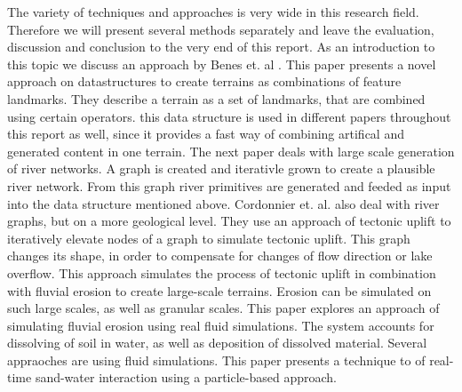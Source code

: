 The variety of techniques and approaches is very wide in this research field. Therefore we will present several methods separately and leave the evaluation, discussion and conclusion to the very end of this report. As an introduction to this topic we discuss an approach by Benes et. al \cite{CGF:CGF12530}. This paper presents a novel approach on datastructures to create terrains as combinations of feature landmarks. They describe a terrain as a set of landmarks, that are combined using certain operators. this data structure is used in different papers throughout this report as well, since it provides a fast way of combining artifical and generated content in one terrain. The next paper  \cite{Genevaux:2013:TGU:2461912.2461996} deals with large scale generation of river networks. A graph is created and iterativle grown to create a plausible river network. From this graph river primitives are generated and feeded as input into the data structure mentioned above. Cordonnier et. al. \cite{cordonnier2016large} also deal with river graphs, but on a more geological level. They use an approach of tectonic uplift to iteratively elevate nodes of a graph to simulate tectonic uplift. This graph changes its shape, in order to compensate for changes of flow direction or lake overflow. This approach simulates the process of tectonic uplift in combination with fluvial erosion to create large-scale terrains. Erosion can be simulated on such large scales, as well as granular scales. This paper \cite{Neidhold:2005:IPB:2381356.2381361} explores an approach of simulating fluvial erosion using real fluid simulations. The system accounts for dissolving of soil in water, as well as deposition of dissolved material. Several appraoches are using fluid simulations. This paper \cite{rungjiratananon2008real} presents a technique to of real-time sand-water interaction using a particle-based approach.



